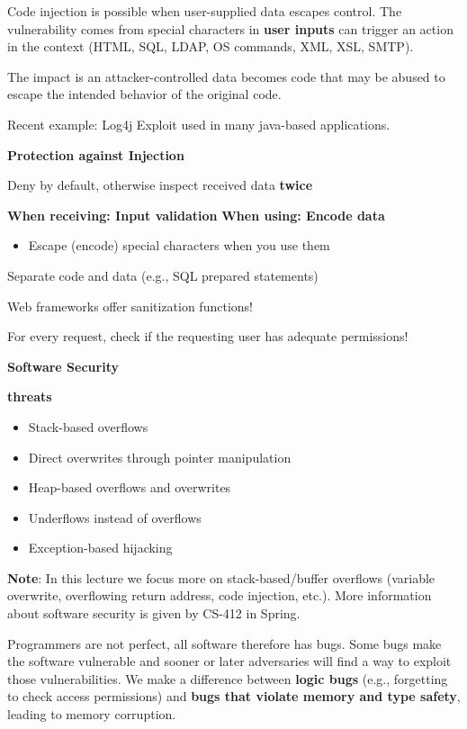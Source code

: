 \documentclass[11pt]{article}
\begin{document}
Code injection is possible when user-supplied data escapes control. The vulnerability comes from special characters in \textbf{user inputs} can trigger an action in the context (HTML, SQL, LDAP, OS commands, XML, XSL, SMTP).

The impact is an attacker-controlled data becomes code that may be abused to escape the intended behavior of the original code. 

Recent example: Log4j Exploit used in many java-based applications.

\textbf{Protection against Injection}

Deny by default, otherwise inspect received data \textbf{twice}

\textbf{When receiving: Input validation}
\textbf{When using: Encode data}
\begin{itemize}
	\item Escape (encode) special characters when you use them
\end{itemize}

Separate code and data (e.g., SQL prepared statements)

Web frameworks offer sanitization functions! 

For every request, check if the requesting user has adequate permissions!

\vspace{0.5cm}

\begin{center}
  {\LARGE \textbf{Software Security}}
\end{center}
\vspace{0.5cm}

\textbf{threats}
\begin{itemize}
	\item Stack-based overflows 
	\item Direct overwrites through pointer manipulation
	\item Heap-based overflows and overwrites
	\item Underflows instead of overflows
	\item Exception-based hijacking
\end{itemize}

\textbf{Note}: In this lecture we focus more on stack-based/buffer overflows (variable overwrite, overflowing return address, code injection, etc.). More information about software security is given by CS-412 in Spring. 

Programmers are not perfect, all software therefore has bugs. Some bugs make the software vulnerable and sooner or later adversaries will find a way to exploit those vulnerabilities. We make a difference between \textbf{logic bugs} (e.g., forgetting to check access permissions) and \textbf{bugs that violate memory and type safety}, leading to memory corruption.
\end{document}
